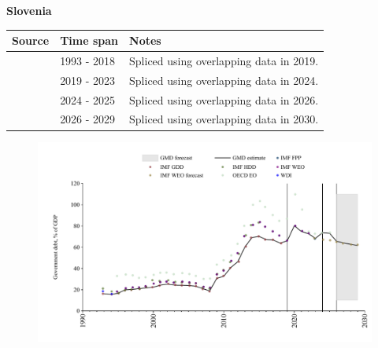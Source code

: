 \documentclass[12pt,a4paper,landscape]{article}
\begin{document}
\begin{adjustbox}{max totalsize={\paperwidth}{\paperheight},center}
\begin{minipage}[t][\textheight][t]{\textwidth}
\vspace*{0.5cm}
{}
\begin{center}
{\Large\bfseries Slovenia}
\end{center}
\vspace{0.5cm}
\begin{table}[H]
\centering
\small
\begin{tabular}{|l|l|l|}
\hline
\textbf{Source} & \textbf{Time span} & \textbf{Notes} \\
\hline
\rowcolor{white}\cite{IMF_GDD}& 1993 - 2018 &Spliced using overlapping data in 2019.\\
\rowcolor{lightgray}\cite{IMF_FPP}& 2019 - 2023 &Spliced using overlapping data in 2024.\\
\rowcolor{white}\cite{OECD_EO}& 2024 - 2025 &Spliced using overlapping data in 2026.\\
\rowcolor{lightgray}\cite{IMF_WEO_forecast}& 2026 - 2029 &Spliced using overlapping data in 2030.\\
\hline
\end{tabular}
\end{table}
\begin{figure}[H]
\centering
\includegraphics[width=\textwidth,height=0.6\textheight,keepaspectratio]{graphs/SVN_govdebt_GDP.pdf}
\end{figure}
\end{minipage}
\end{adjustbox}
\end{document}
